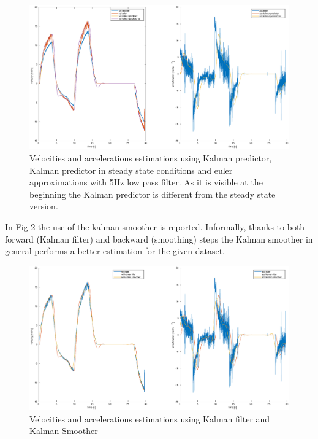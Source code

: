 \documentclass[a4paper,12pt]{article}
\begin{document}
\begin{figure}[H]
    \begin{center}
        \hspace*{-4.6cm}
        \includegraphics[scale=0.5]{images/kalman_predictor.eps}
    \end{center}
    \caption{Velocities and accelerations estimations using Kalman predictor, Kalman predictor in steady state conditions and euler approximations with 5Hz low pass filter. As it is visible at the beginning the Kalman predictor is different from the steady state version.}
    \label{fig:kalman_predictor}
\end{figure}

In Fig \ref{fig:kalman_smoother} the use of the kalman smoother is reported. Informally, thanks to both forward (Kalman filter) and backward (smoothing) steps the Kalman smoother in general performs a better estimation for the given dataset.
\begin{figure}[H]
    \begin{center}
        \hspace*{-4.6cm}
        \includegraphics[scale=0.5]{images/kalman_smoother.eps}
    \end{center}
    \caption{Velocities and accelerations estimations using Kalman filter and Kalman Smoother}
    \label{fig:kalman_smoother}
\end{figure}
\end{document}
